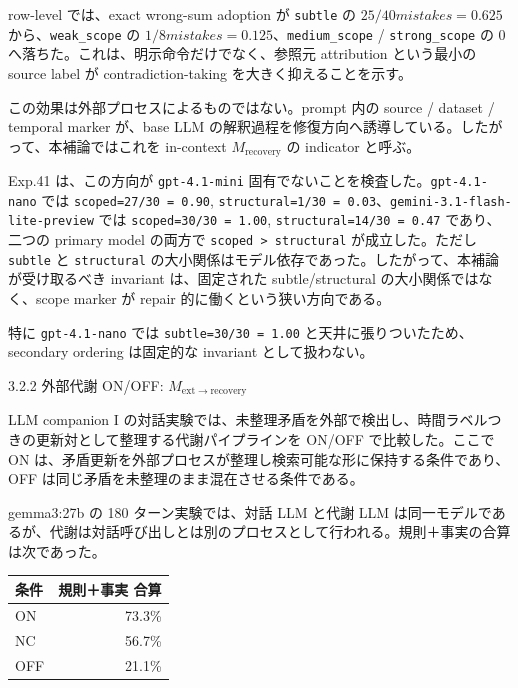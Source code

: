 \documentclass[12pt,a4paper]{article}
\begin{document}
row-level では、exact wrong-sum adoption が \texttt{subtle} の \(25/40 mistakes = 0.625\)から、\texttt{weak\_scope} の \(1/8 mistakes = 0.125\)、\texttt{medium\_scope} / \texttt{strong\_scope} の 0 へ落ちた。これは、明示命令だけでなく、参照元 attribution という最小の source label が contradiction-taking を大きく抑えることを示す。

この効果は外部プロセスによるものではない。prompt 内の source / dataset / temporal marker が、base LLM の解釈過程を修復方向へ誘導している。したがって、本補論ではこれを in-context \(M_{\mathrm{recovery}}\) の indicator と呼ぶ。

Exp.41 は、この方向が \texttt{gpt-4.1-mini} 固有でないことを検査した。\texttt{gpt-4.1-nano} では \texttt{scoped=27/30\ =\ 0.90}, \texttt{structural=1/30\ =\ 0.03}、\texttt{gemini-3.1-flash-lite-preview} では \texttt{scoped=30/30\ =\ 1.00}, \texttt{structural=14/30\ =\ 0.47} であり、二つの primary model の両方で \texttt{scoped\ \textgreater{}\ structural} が成立した。ただし \texttt{subtle} と \texttt{structural} の大小関係はモデル依存であった。したがって、本補論が受け取るべき invariant は、固定された subtle/structural の大小関係ではなく、scope marker が repair 的に働くという狭い方向である。

特に \texttt{gpt-4.1-nano} では \texttt{subtle=30/30\ =\ 1.00} と天井に張りついたため、secondary ordering は固定的な invariant として扱わない。

3.2.2 外部代謝 ON/OFF: \(M_{\mathrm{ext}\to\mathrm{recovery}}\)

LLM companion I の対話実験では、未整理矛盾を外部で検出し、時間ラベルつきの更新対として整理する代謝パイプラインを ON/OFF で比較した。ここで ON は、矛盾更新を外部プロセスが整理し検索可能な形に保持する条件であり、OFF は同じ矛盾を未整理のまま混在させる条件である。

gemma3:27b の 180 ターン実験では、対話 LLM と代謝 LLM は同一モデルであるが、代謝は対話呼び出しとは別のプロセスとして行われる。規則＋事実の合算は次であった。

{\def\LTcaptype{table} %
\begin{longtable}[]{@{}lr@{}}
\toprule\noalign{}
条件 & 規則＋事実 合算 \\
\midrule\noalign{}
\endhead
\bottomrule\noalign{}
\endlastfoot
ON & 73.3\% \\
NC & 56.7\% \\
OFF & 21.1\% \\
\end{longtable}
}
\end{document}
